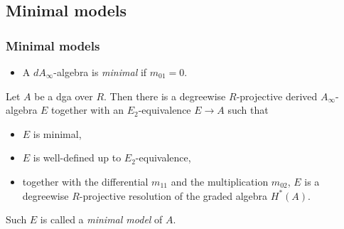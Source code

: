 \documentclass{beamer}
\theoremstyle{definition}
\begin{document}
\subsection{Minimal models}
\begin{frame}
\frametitle{Minimal models}
\begin{itemize}
\item A $dA_\infty$-algebra is \emph{minimal} if $m_{01} = 0$. 
\end{itemize}\pause
\begin{theorem}[Sagave]
Let $A$ be a dga over $R$. Then there is a degreewise
$R$-projective derived $A_\infty$-algebra $E$ together with an $E_2$-equivalence $E \to A$ such that
\begin{itemize}
\item $E$ is minimal,
\item $E$ is well-defined up to $E_2$-equivalence,
\item together with the differential $m_{11}$ and the multiplication $m_{02}$, $E$ is a degreewise $R$-projective
resolution of the graded algebra $H^*(A)$. 
\end{itemize}
\end{theorem}\pause
Such $E$ is called a \emph{minimal model} of $A$.
\end{frame}
\end{document}
